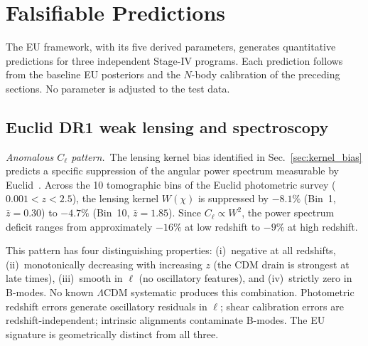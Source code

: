 \documentclass[a4paper,fleqn]{cas-dc}
\begin{document}
\section{Falsifiable Predictions}
\label{sec:predictions}

The EU framework, with its five derived parameters, generates
quantitative predictions for three independent Stage-IV
programs. Each prediction follows from the baseline EU posteriors
and the $N$-body calibration of the preceding sections.
No parameter is adjusted to the test data.

\subsection{Euclid DR1 weak lensing and spectroscopy}
\label{sec:euclid}

\textit{Anomalous $C_\ell$ pattern.}~The lensing kernel bias
identified in Sec.~\ref{sec:kernel_bias} predicts a specific
suppression of the angular power spectrum measurable by
Euclid~\cite{euclid2024}. Across the 10 tomographic bins of the
Euclid photometric survey ($0.001 < z < 2.5$), the lensing
kernel $W(\chi)$ is suppressed by $-8.1\%$ (Bin~1,
$\bar{z} = 0.30$) to $-4.7\%$ (Bin~10, $\bar{z} = 1.85$). 
Since $C_\ell \propto W^2$, the power spectrum deficit ranges
from approximately $-16\%$ at low redshift to $-9\%$ at high
redshift.

This pattern has four distinguishing properties:
(i)~negative at all redshifts, (ii)~monotonically decreasing
with increasing $z$ (the CDM drain is strongest at late
times), (iii)~smooth in $\ell$ (no oscillatory features),
and (iv)~strictly zero in B-modes. No known $\Lambda$CDM
systematic produces this combination. Photometric redshift
errors generate oscillatory residuals in $\ell$; shear
calibration errors are redshift-independent; intrinsic
alignments contaminate B-modes. The EU signature is
geometrically distinct from all three.
\end{document}
